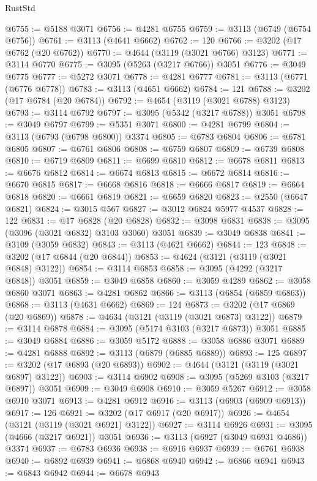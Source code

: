 \begin{lexlean}{RustStd}
\begin{coremodule}
@6755 := @5188 @3071
@6756 := @4281 @6755
@6759 := @3113 (@6749 (@6754 @6756))
@6761 := @3113 (@4641 @6662)
@6762 := 120
@6766 := @3202 (@17 @6762 (@20 @6762))
@6770 := @4644 (@3119 (@3021 @6766) @3123)
@6771 := @3114 @6770
@6775 := @3095 (@5263 (@3217 @6766)) @3051
@6776 := @3049 @6775
@6777 := @5272 @3071
@6778 := @4281 @6777
@6781 := @3113 (@6771 (@6776 @6778))
@6783 := @3113 (@4651 @6662)
@6784 := 121
@6788 := @3202 (@17 @6784 (@20 @6784))
@6792 := @4654 (@3119 (@3021 @6788) @3123)
@6793 := @3114 @6792
@6797 := @3095 (@5342 (@3217 @6788)) @3051
@6798 := @3049 @6797
@6799 := @5351 @3071
@6800 := @4281 @6799
@6804 := @3113 (@6793 (@6798 @6800)) @3374
@6805 := @6783 @6804
@6806 := @6781 @6805
@6807 := @6761 @6806
@6808 := @6759 @6807
@6809 := @6739 @6808
@6810 := @6719 @6809
@6811 := @6699 @6810
@6812 := @6678 @6811
@6813 := @6676 @6812
@6814 := @6674 @6813
@6815 := @6672 @6814
@6816 := @6670 @6815
@6817 := @6668 @6816
@6818 := @6666 @6817
@6819 := @6664 @6818
@6820 := @6661 @6819
@6821 := @6659 @6820
@6823 := @2550 (@6647 @6821)
@6824 := @3015 @567
@6827 := @3012 @6824 @5977 @4537
@6828 := 122
@6831 := @17 @6828 (@20 @6828)
@6832 := @3098 @6831
@6838 := @3095 (@3096 (@3021 @6832) @3103 @3060) @3051
@6839 := @3049 @6838
@6841 := @3109 (@3059 @6832)
@6843 := @3113 (@4621 @6662)
@6844 := 123
@6848 := @3202 (@17 @6844 (@20 @6844))
@6853 := @4624 (@3121 (@3119 (@3021 @6848) @3122))
@6854 := @3114 @6853
@6858 := @3095 (@4292 (@3217 @6848)) @3051
@6859 := @3049 @6858
@6860 := @3059 @4289
@6862 := @3058 @6860 @3071
@6863 := @4281 @6862
@6866 := @3113 (@6854 (@6859 @6863))
@6868 := @3113 (@4631 @6662)
@6869 := 124
@6873 := @3202 (@17 @6869 (@20 @6869))
@6878 := @4634 (@3121 (@3119 (@3021 @6873) @3122))
@6879 := @3114 @6878
@6884 := @3095 (@5174 @3103 (@3217 @6873)) @3051
@6885 := @3049 @6884
@6886 := @3059 @5172
@6888 := @3058 @6886 @3071
@6889 := @4281 @6888
@6892 := @3113 (@6879 (@6885 @6889))
@6893 := 125
@6897 := @3202 (@17 @6893 (@20 @6893))
@6902 := @4644 (@3121 (@3119 (@3021 @6897) @3122))
@6903 := @3114 @6902
@6908 := @3095 (@5269 @3103 (@3217 @6897)) @3051
@6909 := @3049 @6908
@6910 := @3059 @5267
@6912 := @3058 @6910 @3071
@6913 := @4281 @6912
@6916 := @3113 (@6903 (@6909 @6913))
@6917 := 126
@6921 := @3202 (@17 @6917 (@20 @6917))
@6926 := @4654 (@3121 (@3119 (@3021 @6921) @3122))
@6927 := @3114 @6926
@6931 := @3095 (@4666 (@3217 @6921)) @3051
@6936 := @3113 (@6927 (@3049 @6931 @4686)) @3374
@6937 := @6783 @6936
@6938 := @6916 @6937
@6939 := @6761 @6938
@6940 := @6892 @6939
@6941 := @6868 @6940
@6942 := @6866 @6941
@6943 := @6843 @6942
@6944 := @6678 @6943

\end{coremodule}
\end{lexlean}
